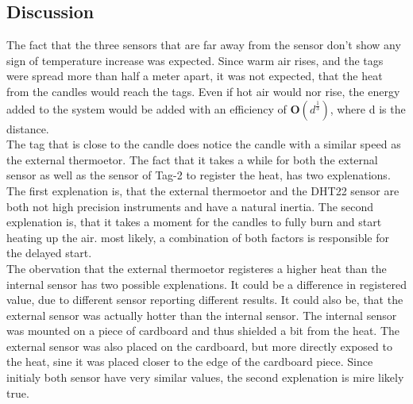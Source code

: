 \subsection{Discussion}
The fact that the three sensors that are far away from the sensor don't show any sign of temperature increase was expected.
Since warm air rises, and the tags were spread more than half a meter apart, it was not expected, that the heat from the candles would reach the tags.
Even if hot air would nor rise, the energy added to the system would  be added with an efficiency of $\mathbf{O}(d^{\frac{1}{3}})$, where d is the distance.\\
The tag that is close to the candle does notice the candle with a similar speed as the external thermoetor.
The fact that it takes a while for both the external sensor as well as the sensor of Tag-2 to register the heat, has two explenations.
The first explenation is, that the external thermoetor and the DHT22 sensor are both not high precision instruments and have a natural inertia.
The second explenation is, that it takes a moment for the candles to fully burn and start heating up the air.
most likely, a combination of both factors is responsible for the delayed start.\\
The obervation that the external thermoetor registeres a higher heat than the internal sensor has two possible explenations.
It could be a difference in registered value, due to different sensor reporting different results.
It could also be, that the external sensor was actually hotter than the internal sensor.
The internal sensor was mounted on a piece of cardboard and thus shielded a bit from the heat.
The external sensor was also placed on the cardboard, but more directly exposed to the heat, sine it was placed closer to the edge of the cardboard piece.
Since initialy both sensor have very similar values, the second explenation is mire likely true.


